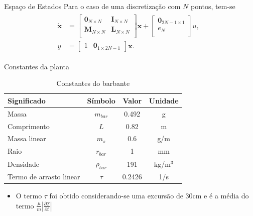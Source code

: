 \documentclass[10pt]{beamer}
\begin{document}
\begin{frame}[fragile]{Espaço de Estados}
Para o caso de uma discretização com $N$ pontos, tem-se 
\begin{align}
\begin{array}{ll}
 	\dot{\mathbf{x}} &= \left[\begin{array}{cc}
	\mathbf{0}_{N\times N} & \mathbf{I}_{N\times N}\\
	\mathbf{M}_{N\times N} & \mathbf{L}_{N\times N}\\
\end{array}\right] \mathbf{x} + \left[\begin{array}{c}
	\mathbf{0}_{2N-1\times 1}\\ e_N\\
\end{array} \right]u,\;\;\\
y &= \left[\begin{array}{cc}
	1 & \textbf{0}_{1\times 2N-1}
\end{array}\right]\textbf{x}.
\end{array}
 \end{align}

\end{frame}



\begin{frame}[fragile]{Constantes da planta}

\begin{block}{}
\begin{table}[!ht]
	\centering
	\caption{Constantes do barbante\label{constanteBarbante}}
	\begin{tabular}{|l|c|c|c|}
		\hline
		\textbf{Significado} & \textbf{Símbolo} & \textbf{Valor} & \textbf{Unidade}\\ \hline \hline
		Massa & $m_{bar}$ & 0.492 & g\\ \hline
		Comprimento & $L$ & 0.82 & m \\ \hline
		Massa linear & $m_s$ & 0.6 & g/m\\ \hline
		Raio & $r_{bar}$ & 1 & mm\\ \hline
		Densidade & $\rho_{bar}$ & 191 & kg/m$^3$\\ \hline
		Termo de arrasto linear & $\tau$ & 0.2426 & 1/s\\ \hline
	\end{tabular}
	
\end{table}

\end{block}

\begin{block}{}
\begin{itemize}
	\item O termo $\tau$ foi obtido considerando-se uma excursão de 30cm e é a média do termo $\frac{\mu}{m}\left|\frac{\partial \Upsilon}{\partial t}\right|$
\end{itemize}	
\end{block}


\end{frame}
\end{document}
